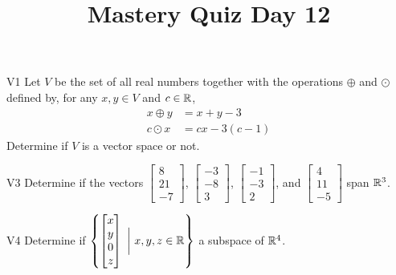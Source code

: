 \documentclass{sbgLAquiz}
\title{Mastery Quiz Day 12 }
\begin{document}
\begin{problem}{V1}
Let $V$ be the  set of all real numbers together with the operations $\oplus$ and $\odot$ defined by, for any $x,y \in V$ and $c \in \mathbb{R}$,
\begin{align*}
x\oplus y  &= x+y-3 \\
c \odot x &= cx-3(c-1)
\end{align*}
Determine if $V$ is a vector space or not.
\end{problem}

\begin{problem}{V3}
Determine if the vectors  $\begin{bmatrix} 8 \\ 21 \\ -7 \end{bmatrix}$, $\begin{bmatrix} -3 \\ -8 \\ 3 \end{bmatrix}$, $\begin{bmatrix} -1 \\ -3 \\ 2 \end{bmatrix}$, and $\begin{bmatrix} 4 \\ 11 \\ -5 \end{bmatrix}$ span $\mathbb{R}^3$.
\end{problem}
\newpage

\begin{problem}{V4}
Determine if $\left\{ \begin{bmatrix} x \\ y \\ 0 \\ z \end{bmatrix}\  \bigg|\ x,y,z \in \mathbb{R}\right\}$  a subspace of $\mathbb{R}^4$.
\end{problem}
\end{document}
